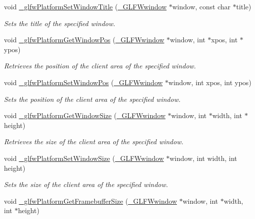 \begin{DoxyCompactItemize}
\item 
void \hyperlink{group__platform_gaed22dd224adc359c8aee05e1f7ccd92b}{\+\_\+glfw\+Platform\+Set\+Window\+Title} (\hyperlink{struct__GLFWwindow}{\+\_\+\+G\+L\+F\+Wwindow} $\ast$window, const char $\ast$title)
\begin{DoxyCompactList}\small\item\em Sets the title of the specified window. \end{DoxyCompactList}\item 
void \hyperlink{group__platform_ga6b1b18b535ef2d5619e3e1bd811a1abf}{\+\_\+glfw\+Platform\+Get\+Window\+Pos} (\hyperlink{struct__GLFWwindow}{\+\_\+\+G\+L\+F\+Wwindow} $\ast$window, int $\ast$xpos, int $\ast$ypos)
\begin{DoxyCompactList}\small\item\em Retrieves the position of the client area of the specified window. \end{DoxyCompactList}\item 
void \hyperlink{group__platform_ga0934dc13a91c13e63e4ad615c23be628}{\+\_\+glfw\+Platform\+Set\+Window\+Pos} (\hyperlink{struct__GLFWwindow}{\+\_\+\+G\+L\+F\+Wwindow} $\ast$window, int xpos, int ypos)
\begin{DoxyCompactList}\small\item\em Sets the position of the client area of the specified window. \end{DoxyCompactList}\item 
void \hyperlink{group__platform_ga553e9df9260702f74ddb6e4e9ca43493}{\+\_\+glfw\+Platform\+Get\+Window\+Size} (\hyperlink{struct__GLFWwindow}{\+\_\+\+G\+L\+F\+Wwindow} $\ast$window, int $\ast$width, int $\ast$height)
\begin{DoxyCompactList}\small\item\em Retrieves the size of the client area of the specified window. \end{DoxyCompactList}\item 
void \hyperlink{group__platform_ga29ba7669f18179be6e7df88f9891db89}{\+\_\+glfw\+Platform\+Set\+Window\+Size} (\hyperlink{struct__GLFWwindow}{\+\_\+\+G\+L\+F\+Wwindow} $\ast$window, int width, int height)
\begin{DoxyCompactList}\small\item\em Sets the size of the client area of the specified window. \end{DoxyCompactList}\item 
void \hyperlink{group__platform_ga46182dc3273499b6cf8cb3deb7da2964}{\+\_\+glfw\+Platform\+Get\+Framebuffer\+Size} (\hyperlink{struct__GLFWwindow}{\+\_\+\+G\+L\+F\+Wwindow} $\ast$window, int $\ast$width, int $\ast$height)

\end{DoxyCompactItemize}
